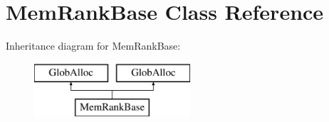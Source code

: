 \hypertarget{classMemRankBase}{\section{Mem\-Rank\-Base Class Reference}
\label{classMemRankBase}
}
Inheritance diagram for Mem\-Rank\-Base\-:\begin{figure}[H]
\begin{center}
\leavevmode
\includegraphics[height=2.000000cm]{classMemRankBase}
\end{center}
\end{figure}
